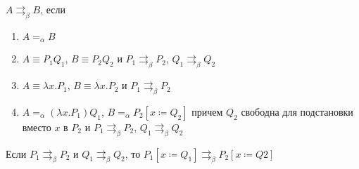 \newcommand{\bpar}{\rightrightarrows_{\beta}}

\begin{definition}
	$A\bpar B$, если
	\begin{enumerate}
		\item $A=_{\alpha}B$
		\item $A\equiv{}P_{1}Q_{1}$, $B\equiv{}P_{2}Q_{2}$ и $P_{1}\bpar P_{2}$, $Q_{1}\bpar Q_{2}$
		\item $A\equiv{}\lambda{}x.P_{1}$, $B\equiv{}\lambda{}x.P_{2}$ и 
		$P_{1}\bpar P_{2}$
		\item $A=_{\alpha}(\lambda{}x.P_1)Q_1$, $B=_{\alpha}P_2[x\coloneqq{}Q_2]$ причем $Q_2$ свободна для подстановки вместо $x$ в $P_2$ и $P_1 \bpar P_2$, $Q_1 \bpar Q_2$
	\end{enumerate}
\end{definition}

\begin{lemma}
	\label{bparhelp}
	Если $P_{1}\bpar P_{2}$ и $Q_{1}\bpar Q_{2}$, то $P_{1}[x\coloneqq{}Q_{1}]\bpar P_{2}[x\coloneqq{}Q2]$
\end{lemma}


